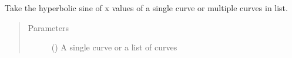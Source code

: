 \documentclass[letterpaper,10pt,english]{sphinxmanual}
\begin{document}
\begin{fulllineitems}
\label{\detokenize{pydv:pydvpy.sinhx}}
Take the hyperbolic sine of x values of a single curve or multiple curves in list.

\begin{sphinxVerbatim}[commandchars=\\\{\}]
  
\end{sphinxVerbatim}

\begin{sphinxVerbatim}[commandchars=\\\{\}]
\end{sphinxVerbatim}
\begin{quote}\begin{description}
\item[{Parameters}] \leavevmode
{} () \textendash{} A single curve or a list of curves

\end{description}\end{quote}

\end{fulllineitems}

\end{document}
